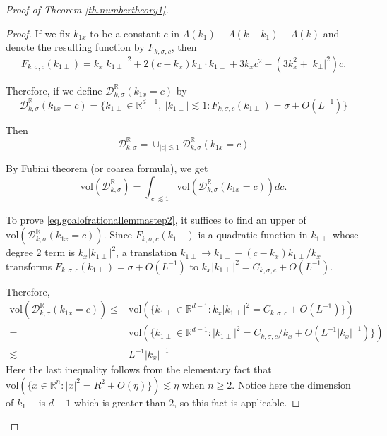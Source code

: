 \begin{proof}[Proof of Theorem \ref{th.numbertheory1}]
\begin{proof}
If we fix $k_{1x}$ to be a constant $c$ in $\Lambda(k_1)+\Lambda(k-k_1)-\Lambda(k)$ and denote the resulting function by $F_{k,\sigma, c}$, then 
\begin{equation}
    F_{k,\sigma, c}(k_{1\perp})=k_x|k_{1\perp}|^2+2(c-k_x)k_{\perp}\cdot k_{1\perp}+3k_x c^2-(3k_x^2+|k_{\perp}|^2)c.
\end{equation}

Therefore, if we define $\mathcal{D}^{\mathbb{R}}_{k,\sigma}(k_{1x}=c)$ by
\begin{equation}
\mathcal{D}^{\mathbb{R}}_{k,\sigma}(k_{1x}=c)=\{k_{1\perp}\in \mathbb{R}^{d-1},\ |k_{1\perp}|\lesssim 1:F_{k,\sigma, c}(k_{1\perp})=\sigma+O(L^{-1})\}
\end{equation}

Then 
\begin{equation}
    \mathcal{D}^{\mathbb{R}}_{k,\sigma}=\cup_{|c|\lesssim 1} \mathcal{D}^{\mathbb{R}}_{k,\sigma}(k_{1x}=c)
\end{equation}

By Fubini theorem (or coarea formula), we get
\begin{equation}\label{eq.rationallemmastep2'}
    \text{vol}(\mathcal{D}^{\mathbb{R}}_{k,\sigma})=\int_{|c|\lesssim 1} \text{vol}(\mathcal{D}^{\mathbb{R}}_{k,\sigma}(k_{1x}=c)) dc.
\end{equation}

To prove \eqref{eq.goalofrationallemmastep2}, it suffices to find an upper of $\text{vol}(\mathcal{D}^{\mathbb{R}}_{k,\sigma}(k_{1x}=c))$. Since $F_{k,\sigma, c}(k_{1\perp})$ is a quadratic function in $k_{1\perp}$ whose degree 2 term is $k_x|k_{1\perp}|^2$, a translation $k_{1\perp}\rightarrow k_{1\perp}-(c-k_x)k_{1\perp}/k_x$ transforms $F_{k,\sigma, c}(k_{1\perp})=\sigma+O(L^{-1})$ to $k_x|k_{1\perp}|^2=C_{k,\sigma,c}+O(L^{-1})$.

Therefore, 
\begin{equation}\label{eq.rationallemmastep2''}
\begin{split}
    \text{vol}(\mathcal{D}^{\mathbb{R}}_{k,\sigma}(k_{1x}=c))\le &\text{vol}(\{k_{1\perp}\in \mathbb{R}^{d-1}:k_x|k_{1\perp}|^2=C_{k,\sigma,c}+O(L^{-1})\})
    \\
    =& \text{vol}(\{k_{1\perp}\in \mathbb{R}^{d-1}:|k_{1\perp}|^2=C_{k,\sigma,c}/k_x+O(L^{-1}|k_x|^{-1})\})
    \\
    \lesssim& L^{-1}|k_x|^{-1}
\end{split}
\end{equation}
Here the last inequality follows from the elementary fact that $\text{vol}(\{x\in \mathbb{R}^n:|x|^2=R^2+O(\eta)\})\lesssim \eta$ when $n\ge 2$. Notice here the dimension of $k_{1\perp}$ is $d-1$ which is greater than $2$, so this fact is applicable.


\end{proof}
\end{proof}

